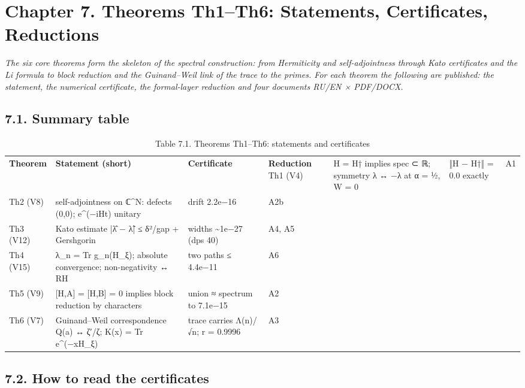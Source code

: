 \documentclass[11pt,a4paper]{article}
\begin{document}
\section{Chapter 7. Theorems Th1–Th6: Statements, Certificates, Reductions}

\noindent\textit{\color{copper}The six core theorems form the skeleton of the spectral construction: from Hermiticity and self-adjointness through Kato certificates and the Li formula to block reduction and the Guinand–Weil link of the trace to the primes. For each theorem the following are published: the statement, the numerical certificate, the formal-layer reduction and four documents RU/EN × PDF/DOCX.}

\subsection{7.1. Summary table}

\begin{table}[htbp]\centering\small
\caption{Table 7.1. Theorems Th1–Th6: statements and certificates}
\begin{tabular}{p{} p{} p{} p{}}
\toprule
\textbf{Theorem} & \textbf{Statement (short)} & \textbf{Certificate} & \textbf{Reduction}
\midrule
Th1 (V4) & H = H† implies spec ⊂ ℝ; symmetry λ ↔ −λ at α = ½, W = 0 & ‖H − H†‖ = 0.0 exactly & A1 \\
Th2 (V8) & self-adjointness on ℂ\textasciicircum{}N: defects (0,0); e\textasciicircum{}(−iHt) unitary & drift 2.2e−16 & A2b \\
Th3 (V12) & Kato estimate |λ̂ − λ̃| ≤ δ²/gap + Gershgorin & widths \textasciitilde{}1e−27 (dps 40) & A4, A5 \\
Th4 (V15) & λ\_n = Tr g\_n(H\_ξ); absolute convergence; non-negativity ↔ RH & two paths ≤ 4.4e−11 & A6 \\
Th5 (V9) & [H,A] = [H,B] = 0 implies block reduction by characters & union ≈ spectrum to 7.1e−15 & A2 \\
Th6 (V7) & Guinand–Weil correspondence Q(a) ↔ ζ′/ζ; K(x) = Tr e\textasciicircum{}(−xH\_ξ) & trace carries Λ(n)/√n; r = 0.9996 & A3 \\
\bottomrule
\end{tabular}
\end{table}

\subsection{7.2. How to read the certificates}
\end{document}
